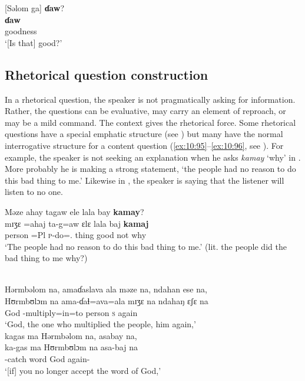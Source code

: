 \ea \label{ex:10:94}
{}[Səlom ga]  \textbf{ɗaw}?\\
\gll  [sʊlɔm  ga] \textbf{ɗaw}\\
      goodness  {\ADJ}  {\QUEST}\\
\glt  ‘[Is that] good?’              
\z 

\subsection{Rhetorical question construction}\label{sec:10.3.4}
\hypertarget{RefHeading1213061525720847}{}
In a rhetorical question, the speaker is not pragmatically asking for information. Rather, the questions can be evaluative, may carry an element of reproach, or may be a mild command. The context gives the rhetorical force. Some rhetorical questions have a special emphatic structure (see ) but many have the normal interrogative structure for a content question (\ref{ex:10:95}–\ref{ex:10:96}, see ). For example, the speaker is not seeking an explanation when he asks \textit{kamay} ‘why’ in . More probably he is making a strong statement, ‘the people had no reason to do this bad thing to me.’ Likewise in , the speaker is saying that the listener will listen to no one. 

\ea \label{ex:10:95}
Məze  ahay  tagaw  ele  lala  bay  \textbf{kamay}?\\
\gll  mɪʒɛ  =ahaj  ta-g=aw  ɛlɛ  lala  baj  \textbf{kamaj}\\
      person  =Pl  \textsc{p}-do={\oneS}.{\IO}  thing  good  not  why\\
\glt  ‘The people had no reason to do this bad thing to me.’ (lit. the people did the bad thing to me why?)
\z 

\ea \label{ex:10:96}
\\
Hərmbəlom  na,  amaɗaslava  ala  məze  na,  ndahan  ese  na,\\   
\gll  Hʊrmbʊlɔm  na  ama-ɗaɬ=ava=ala  mɪʒɛ   na  ndahaŋ  ɛʃɛ na \\ 
      God  {\PSP}    {\DEP}-multiply=in=to   person   {\PSP}     \textsc{s}     again    {\PSP} \\     
\glt ‘God, the one who multiplied the people, him again,’\\
      
      \medskip
kagas  ma  Hərmbəlom  na,  asabay  na,\\       
\gll ka-gas ma Hʊrmbʊlɔm na asa-baj na \\ 
     {\twoS}-catch   word     God             {\PSP}  again-{\NEG}  {\PSP} \\ 
\glt ‘[if] you no longer accept the word of God,’\\ 

